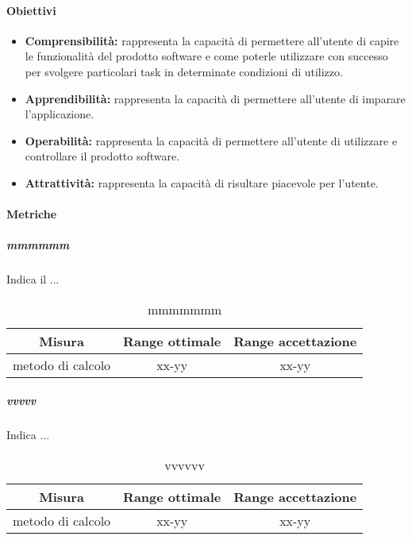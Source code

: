 		\paragraph{Obiettivi}
			\begin{itemize}
				\item \textbf{Comprensibilità:} rappresenta la capacità di permettere all'utente di capire le funzionalità del prodotto software e come poterle utilizzare con successo per svolgere particolari task in determinate condizioni di utilizzo.
				\item \textbf{Apprendibilità:} rappresenta la capacità di permettere all'utente di imparare l'applicazione.
				\item \textbf{Operabilità:} rappresenta la capacità di permettere all'utente di utilizzare e controllare il prodotto software.
				\item \textbf{Attrattività:} rappresenta la capacità di risultare piacevole per l'utente.
			\end{itemize}
		
		\paragraph{Metriche}
			\subparagraph{mmmmmm}
			Indica il ...
			
			\begin{table}[H]
				\begin{center}
					\begin{tabular}{|c|c|c|}
						\hline
						\textbf{Misura} & \textbf{Range ottimale} & \textbf{Range accettazione} \\
						\hline
						metodo di calcolo & xx-yy  & xx-yy \\
						\hline
					\end{tabular}
				\end{center}
				\caption{mmmmmmm}
			\end{table}
		
			\subparagraph{vvvvv}
			Indica ...
			\begin{table}[H]
				\begin{center}
					\begin{tabular}{|c|c|c|}
						\hline
						\textbf{Misura} & \textbf{Range ottimale} & \textbf{Range accettazione} \\
						\hline
						metodo di calcolo & xx-yy  & xx-yy \\
						\hline
					\end{tabular}
				\end{center}
				\caption{vvvvvv}
			\end{table}
	
